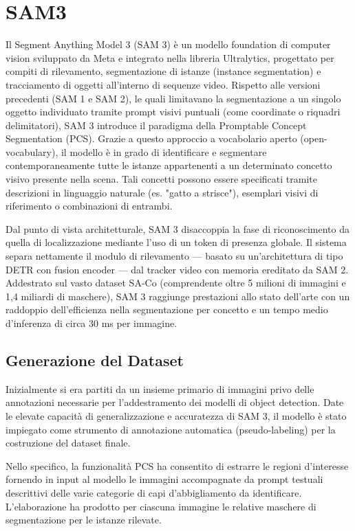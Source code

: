 \chapter{SAM3}

Il Segment Anything Model 3 (SAM 3) è un modello foundation di computer vision sviluppato da Meta e integrato nella libreria Ultralytics,
progettato per compiti di rilevamento, segmentazione di istanze (instance segmentation) e tracciamento di oggetti all'interno di sequenze video.
Rispetto alle versioni precedenti (SAM 1 e SAM 2), le quali limitavano la segmentazione a un singolo oggetto individuato tramite prompt visivi puntuali (come coordinate o riquadri delimitatori),
SAM 3 introduce il paradigma della Promptable Concept Segmentation (PCS). Grazie a questo approccio a vocabolario aperto (open-vocabulary),
il modello è in grado di identificare e segmentare contemporaneamente tutte le istanze appartenenti a un determinato concetto visivo presente nella scena.
Tali concetti possono essere specificati tramite descrizioni in linguaggio naturale (es. "gatto a strisce"),
esemplari visivi di riferimento o combinazioni di entrambi.

Dal punto di vista architetturale, SAM 3 disaccoppia la fase di riconoscimento da quella di localizzazione mediante l'uso di un token di presenza globale.
Il sistema separa nettamente il modulo di rilevamento — basato su un'architettura di tipo DETR con fusion encoder — dal tracker video con memoria ereditato da SAM 2.
Addestrato sul vasto dataset SA-Co (comprendente oltre 5 milioni di immagini e 1,4 miliardi di maschere),
SAM 3 raggiunge prestazioni allo stato dell'arte con un raddoppio dell'efficienza nella segmentazione per concetto e un tempo medio d'inferenza di circa 30 ms per immagine. \cite{sam3}

\newpage

\section{Generazione del Dataset}

Inizialmente si era partiti da un insieme primario di immagini privo delle annotazioni necessarie per l'addestramento dei modelli di object detection.
Date le elevate capacità di generalizzazione e accuratezza di SAM 3, il modello è stato impiegato come strumento di annotazione automatica (pseudo-labeling) per la costruzione del dataset finale.

Nello specifico, la funzionalità PCS ha consentito di estrarre le regioni d'interesse
fornendo in input al modello le immagini accompagnate da prompt testuali descrittivi delle varie categorie di capi d'abbigliamento da identificare.
L'elaborazione ha prodotto per ciascuna immagine le relative maschere di segmentazione per le istanze rilevate.

